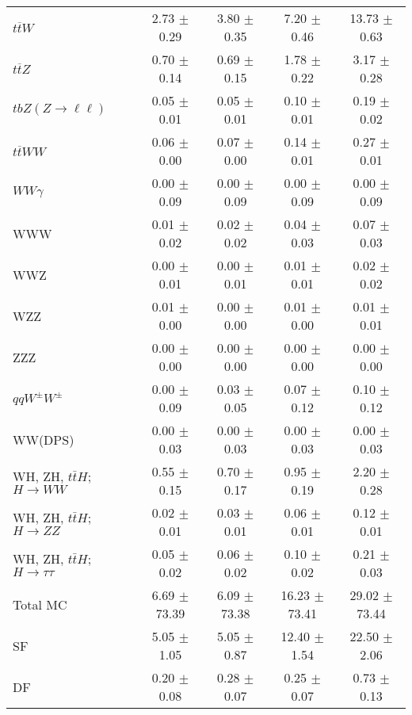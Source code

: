 \begin{tabular}{l|cccc}
                   $t\overline{t}W$ &  2.73 $\pm$  0.29 &  3.80 $\pm$  0.35 &  7.20 $\pm$  0.46 & 13.73 $\pm$  0.63 \\
                   $t\overline{t}Z$ &  0.70 $\pm$  0.14 &  0.69 $\pm$  0.15 &  1.78 $\pm$  0.22 &  3.17 $\pm$  0.28 \\
    $tbZ (Z \rightarrow \ell \ell)$ &  0.05 $\pm$  0.01 &  0.05 $\pm$  0.01 &  0.10 $\pm$  0.01 &  0.19 $\pm$  0.02 \\
                  $t\overline{t}WW$ &  0.06 $\pm$  0.00 &  0.07 $\pm$  0.00 &  0.14 $\pm$  0.01 &  0.27 $\pm$  0.01 \\
                         $WW\gamma$ &  0.00 $\pm$  0.09 &  0.00 $\pm$  0.09 &  0.00 $\pm$  0.09 &  0.00 $\pm$  0.09 \\
                                WWW &  0.01 $\pm$  0.02 &  0.02 $\pm$  0.02 &  0.04 $\pm$  0.03 &  0.07 $\pm$  0.03 \\
                                WWZ &  0.00 $\pm$  0.01 &  0.00 $\pm$  0.01 &  0.01 $\pm$  0.01 &  0.02 $\pm$  0.02 \\
                                WZZ &  0.01 $\pm$  0.00 &  0.00 $\pm$  0.00 &  0.01 $\pm$  0.00 &  0.01 $\pm$  0.01 \\
                                ZZZ &  0.00 $\pm$  0.00 &  0.00 $\pm$  0.00 &  0.00 $\pm$  0.00 &  0.00 $\pm$  0.00 \\
                 $qqW^{\pm}W^{\pm}$ &  0.00 $\pm$  0.09 &  0.03 $\pm$  0.05 &  0.07 $\pm$  0.12 &  0.10 $\pm$  0.12 \\
                            WW(DPS) &  0.00 $\pm$  0.03 &  0.00 $\pm$  0.03 &  0.00 $\pm$  0.03 &  0.00 $\pm$  0.03 \\
WH, ZH, $t\bar{t}H$; $H \rightarrow WW$ &  0.55 $\pm$  0.15 &  0.70 $\pm$  0.17 &  0.95 $\pm$  0.19 &  2.20 $\pm$  0.28 \\
WH, ZH, $t\bar{t}H$; $H \rightarrow ZZ$ &  0.02 $\pm$  0.01 &  0.03 $\pm$  0.01 &  0.06 $\pm$  0.01 &  0.12 $\pm$  0.01 \\
WH, ZH, $t\bar{t}H$; $H \rightarrow \tau\tau$ &  0.05 $\pm$  0.02 &  0.06 $\pm$  0.02 &  0.10 $\pm$  0.02 &  0.21 $\pm$  0.03 \\
\hline\hline
                           Total MC &  6.69 $\pm$ 73.39 &  6.09 $\pm$ 73.38 & 16.23 $\pm$ 73.41 & 29.02 $\pm$ 73.44 \\
\hline
                                 SF &  5.05 $\pm$  1.05 &  5.05 $\pm$  0.87 & 12.40 $\pm$  1.54 & 22.50 $\pm$  2.06 \\
                                 DF &  0.20 $\pm$  0.08 &  0.28 $\pm$  0.07 &  0.25 $\pm$  0.07 &  0.73 $\pm$  0.13 \\

\end{tabular}
